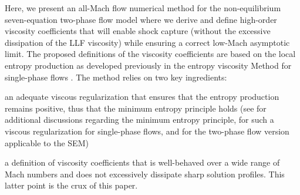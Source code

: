 \documentclass[preprint,10pt]{elsarticle}
\begin{document}
Here, we present an all-Mach flow numerical method for the non-equilibrium seven-equation two-phase flow model where we derive and define high-order viscosity coefficients that will enable shock capture (without the excessive dissipation of the LLF viscosity) while ensuring a correct low-Mach asymptotic limit. The 
proposed definitions of the viscosity coefficients are based on the local entropy production as developed previously in the entropy viscosity Method for
single-phase flows \cite{GuermondSIAM2014, GuermondCSE2011}. 
The method relies on two key ingredients: 
\ben
\item  an adequate viscous regularization that ensures that the entropy production remains positive, thus that the minimum entropy principle holds 
(see \cite{tadmor_minimum_entropy_principle} for additional discussions regarding the minimum entropy principle, \cite{GuermondSIAM2014}
for such a viscous regularization for single-phase flows, and \cite{Marco_paper_sem} for the two-phase flow version applicable to the SEM)
\item a definition of viscosity coefficients that is well-behaved over a wide range of Mach numbers and does not excessively dissipate sharp solution profiles. 
\een
This latter point is the crux of this paper.
%
\end{document}
